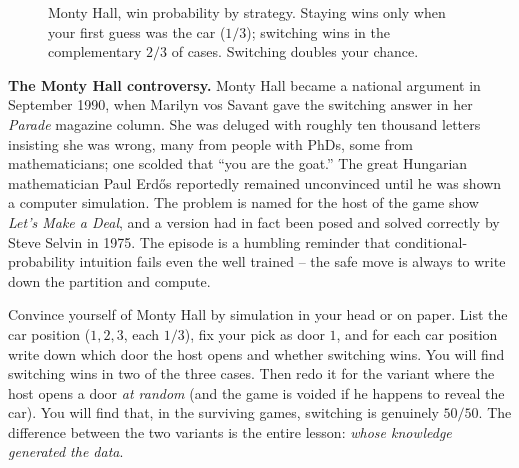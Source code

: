 \begin{figure}[H]
\centering
{}
\caption{Monty Hall, win probability by strategy. Staying wins only when your first guess was the car ($1/3$); switching wins in the complementary $2/3$ of cases. Switching doubles your chance.}
\label{ch04:fig-monty}
\end{figure}

\begin{marginnotebox}
\textbf{The Monty Hall controversy.} Monty Hall became a national argument in September 1990, when Marilyn vos Savant gave the switching answer in her \emph{Parade} magazine column. She was deluged with roughly ten thousand letters insisting she was wrong, many from people with PhDs, some from mathematicians; one scolded that ``you are the goat.'' The great Hungarian mathematician Paul Erd\H{o}s reportedly remained unconvinced until he was shown a computer simulation. The problem is named for the host of the game show \emph{Let's Make a Deal}, and a version had in fact been posed and solved correctly by Steve Selvin in 1975. The episode is a humbling reminder that conditional-probability intuition fails even the well trained -- the safe move is always to write down the partition and compute.
\end{marginnotebox}

\begin{labbox}
Convince yourself of Monty Hall by simulation in your head or on paper. List the car position ($1,2,3$, each $1/3$), fix your pick as door $1$, and for each car position write down which door the host opens and whether switching wins. You will find switching wins in two of the three cases. Then redo it for the variant where the host opens a door \emph{at random} (and the game is voided if he happens to reveal the car). You will find that, in the surviving games, switching is genuinely $50/50$. The difference between the two variants is the entire lesson: \emph{whose knowledge generated the data}.
\end{labbox}

